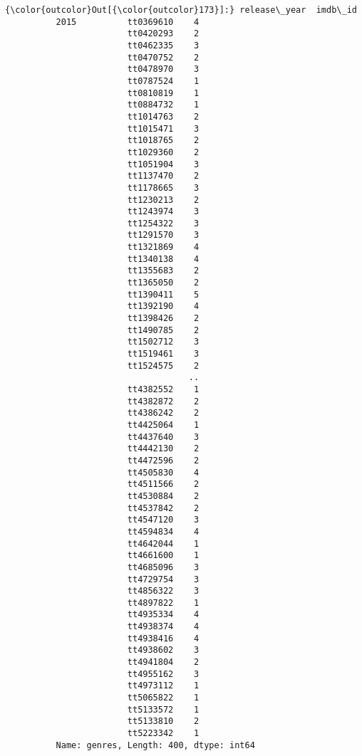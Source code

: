 \documentclass[11pt]{article}
\begin{document}
\begin{Verbatim}[commandchars=\\\{\}]
{\color{outcolor}Out[{\color{outcolor}173}]:} release\_year  imdb\_id  
          2015          tt0369610    4
                        tt0420293    2
                        tt0462335    3
                        tt0470752    2
                        tt0478970    3
                        tt0787524    1
                        tt0810819    1
                        tt0884732    1
                        tt1014763    2
                        tt1015471    3
                        tt1018765    2
                        tt1029360    2
                        tt1051904    3
                        tt1137470    2
                        tt1178665    3
                        tt1230213    2
                        tt1243974    3
                        tt1254322    3
                        tt1291570    3
                        tt1321869    4
                        tt1340138    4
                        tt1355683    2
                        tt1365050    2
                        tt1390411    5
                        tt1392190    4
                        tt1398426    2
                        tt1490785    2
                        tt1502712    3
                        tt1519461    3
                        tt1524575    2
                                    ..
                        tt4382552    1
                        tt4382872    2
                        tt4386242    2
                        tt4425064    1
                        tt4437640    3
                        tt4442130    2
                        tt4472596    2
                        tt4505830    4
                        tt4511566    2
                        tt4530884    2
                        tt4537842    2
                        tt4547120    3
                        tt4594834    4
                        tt4642044    1
                        tt4661600    1
                        tt4685096    3
                        tt4729754    3
                        tt4856322    3
                        tt4897822    1
                        tt4935334    4
                        tt4938374    4
                        tt4938416    4
                        tt4938602    3
                        tt4941804    2
                        tt4955162    3
                        tt4973112    1
                        tt5065822    1
                        tt5133572    1
                        tt5133810    2
                        tt5223342    1
          Name: genres, Length: 400, dtype: int64
\end{Verbatim}
            
\end{document}
